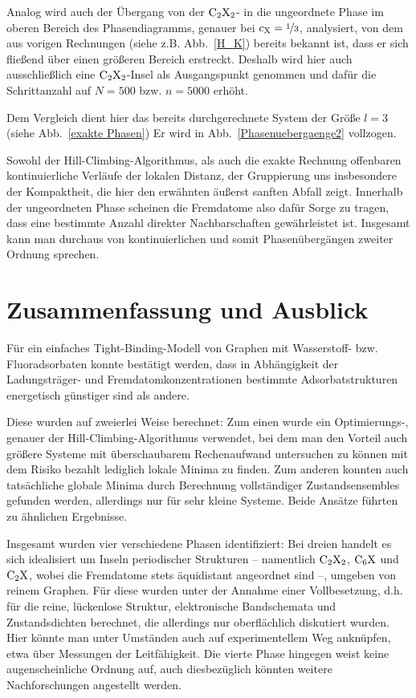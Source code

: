 \documentclass[a4paper, 10pt, twoside, openany]{book} %
\def \cX {c_\mathrm{X}}
\begin{document}
%
Analog wird auch der Übergang von der $\rm C_2X_2$- in die ungeordnete Phase im oberen Bereich des Phasendiagramms, genauer bei $\cX = \nicefrac 1 3$, analysiert, von dem aus vorigen Rechnungen (siehe z.B. Abb.~\ref{H_K}) bereits bekannt ist, dass er sich fließend über einen größeren Bereich erstreckt. Deshalb wird hier auch ausschließlich eine $\rm C_2X_2$-Insel als Ausgangspunkt genommen und dafür die Schrittanzahl auf $N = 500$ bzw. $n = 5000$ erhöht.

Dem Vergleich dient hier das bereits durchgerechnete System der Größe $l = 3$ (siehe Abb.~\ref{exakte Phasen}) Er wird in Abb.~\ref{Phasenuebergaenge2} vollzogen.

Sowohl der Hill-Climbing-Algorithmus, als auch die exakte Rechnung offenbaren kontinuierliche Verläufe der lokalen Distanz, der Gruppierung uns insbesondere der Kompaktheit, die hier den erwähnten äußerst sanften Abfall zeigt. Innerhalb der ungeordneten Phase scheinen die Fremdatome also dafür Sorge zu tragen, dass eine bestimmte Anzahl direkter Nachbarschaften gewährleistet ist. Insgesamt kann man durchaus von kontinuierlichen und somit Phasenübergängen zweiter Ordnung sprechen.

\chapter{Zusammenfassung und Ausblick}

Für ein einfaches Tight-Binding-Modell von Graphen mit Wasserstoff- bzw. Fluoradsorbaten konnte bestätigt werden, dass in Abhängigkeit der Ladungsträger- und Fremdatomkonzentrationen bestimmte Adsorbatstrukturen energetisch günstiger sind als andere.

Diese wurden auf zweierlei Weise berechnet: Zum einen wurde ein Optimierungs-, genauer der Hill-Climbing-Algorithmus verwendet, bei dem man den Vorteil auch größere Systeme mit überschaubarem Rechenaufwand untersuchen zu können mit dem Risiko bezahlt lediglich lokale Minima zu finden. Zum anderen konnten auch tatsächliche globale Minima durch Berechnung vollständiger Zustandsensembles gefunden werden, allerdings nur für sehr kleine Systeme. Beide Ansätze führten zu ähnlichen Ergebnisse.

Insgesamt wurden vier verschiedene Phasen identifiziert: Bei dreien handelt es sich idealisiert um Inseln periodischer Strukturen -- namentlich $\rm C_2X_2$, $\rm C_6X$ und $\rm C_2X$, wobei die Fremdatome stets äquidistant angeordnet sind --, umgeben von reinem Graphen. Für diese wurden unter der Annahme einer Vollbesetzung, d.h. für die reine, lückenlose Struktur, elektronische Bandschemata und Zustandsdichten berechnet, die allerdings nur oberflächlich diskutiert wurden. Hier könnte man unter Umständen auch auf experimentellem Weg anknüpfen, etwa über Messungen der Leitfähigkeit. Die vierte Phase hingegen weist keine augenscheinliche Ordnung auf, auch diesbezüglich könnten weitere Nachforschungen angestellt werden.
\end{document}
